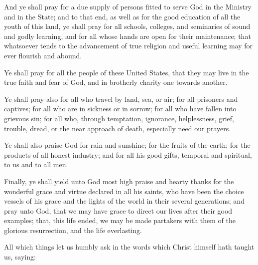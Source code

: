 And ye shall pray for a due supply of persons fitted to serve God in the Ministry and in the State; and to that end, as well as for the good education of all the youth of this land, ye shall pray for all schools, colleges, and seminaries of sound and godly learning, and for all whose hands are open for their maintenance; that whatsoever tends to the advancement of true religion and useful learning may for ever flourish and abound.

Ye shall pray for all the people of these United States, that they may live in the true faith and fear of God, and in brotherly charity one towards another.

Ye shall pray also for all who travel by land, sea, or air; for all prisoners and captives; for all who are in sickness or in sorrow; for all who have fallen into grievous sin; for all who, through temptation, ignorance, helplessness, grief, trouble, dread, or the near approach of death, especially need our prayers.

Ye shall also praise God for rain and sunshine; for the fruits of the earth; for the products of all honest industry; and for all his good gifts, temporal and spiritual, to us and to all men.

Finally, ye shall yield unto God most high praise and hearty thanks for the wonderful grace and virtue declared in all his saints, who have been the choice vessels of his grace and the lights of the world in their several generations; and pray unto God, that we may have grace to direct our lives after their good examples; that, this life ended, we may be made partakers with them of the glorious resurrection, and the life everlasting.

All which things let us humbly ask in the words which Christ himself hath taught us, saying:

 

\fleuron
